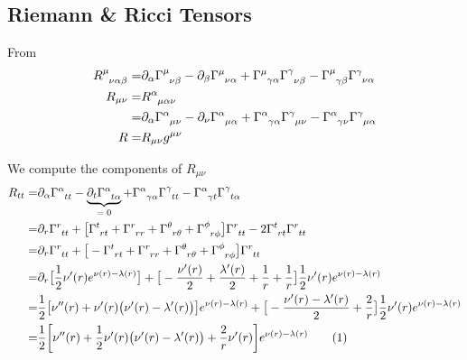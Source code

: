 \documentclass[]{article}
\newcommand\numberthis{\addtocounter{equation}{1}\tag{\theequation}}
\begin{document}
\subsection{Riemann \& Ricci Tensors}

From \cite[Lecture II]{akhmedov2016lectures}
\begin{align*}
	R\indices{^\mu_{\nu\alpha\beta}} =& \partial_\alpha \Gamma\indices{^\mu_{\nu\beta}} - \partial_\beta \Gamma\indices{^\mu_{\nu\alpha}} + \Gamma\indices{^\mu_{\gamma\alpha}} \Gamma\indices{^\gamma_{\nu\beta}} - \Gamma\indices{^\mu_{\gamma\beta}} \Gamma\indices{^\gamma_{\nu\alpha}}\\
	R_{\mu\nu} =& R\indices{^\alpha_{\mu\alpha\nu}}\\
	=& \partial_\alpha \Gamma\indices{^\alpha_{\mu\nu}} - \partial_\nu \Gamma\indices{^\alpha_{\mu\alpha}} + \Gamma\indices{^\alpha_{\gamma\alpha}} \Gamma\indices{^\gamma_{\mu\nu}} - \Gamma\indices{^\alpha_{\gamma\nu}} \Gamma\indices{^\gamma_{\mu\alpha}}\\
	R =& R_{\mu\nu} g^{\mu\nu}
\end{align*}

We compute the components of $R_{\mu\nu}$
\begin{align*}
	R_{tt} =& \partial_\alpha \Gamma\indices{^\alpha_{tt}} - \underbrace{\partial_t \Gamma\indices{^\alpha_{t\alpha}}}_\text{$=0$} + \Gamma\indices{^\alpha_{\gamma\alpha}} \Gamma\indices{^\gamma_{tt}} - \Gamma\indices{^\alpha_{\gamma t}} \Gamma\indices{^\gamma_{t\alpha}} \\
	=& \partial_r \Gamma\indices{^r_{tt}}  + \big[\Gamma\indices{^t_{rt}}+\Gamma\indices{^r_{rr}} + \Gamma\indices{^\theta_{r\theta}}+ \Gamma\indices{^\phi_{r\phi}}\big] \Gamma\indices{^r_{tt}} - 2\Gamma\indices{^t_{r t}} \Gamma\indices{^r_{tt}} \\
	=& \partial_r \Gamma\indices{^r_{tt}}  + \big[-\Gamma\indices{^t_{rt}}+\Gamma\indices{^r_{rr}} + \Gamma\indices{^\theta_{r\theta}}+ \Gamma\indices{^\phi_{r\phi}}\big] \Gamma\indices{^r_{tt}} \\
	=& \partial_r \big[\frac{1}{2} \nu^\prime(r) e^{\nu(r)-\lambda(r)}\big]  + \big[-\frac{\nu^\prime(r)}{2}+\frac{\lambda^\prime(r)}{2} + \frac{1}{r} + \frac{1}{r}\big] \frac{1}{2} \nu^\prime(r) e^{\nu(r)-\lambda(r)}  \\
	=& \frac{1}{2} \big[ \nu^{\prime\prime}(r) + \nu^\prime(r) \big(\nu^\prime(r)-\lambda^\prime(r)\big)\big] e^{\nu(r)-\lambda(r)}+ \big[-\frac{\nu^\prime(r)-\lambda^\prime(r)}{2} + \frac{2}{r}\big] \frac{1}{2} \nu^\prime(r) e^{\nu(r)-\lambda(r)} \\
	=& \frac{1}{2} \bigg[\nu^{\prime\prime}(r) + \frac{1}{2}\nu^\prime(r) \big(\nu^\prime(r)-\lambda^\prime(r)\big)+ \frac{2}{r}\nu^\prime(r)\bigg] e^{\nu(r)-\lambda(r)} \numberthis \label{eq:Rtt}
\end{align*}
\end{document}
